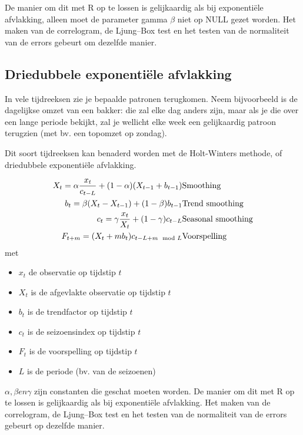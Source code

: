 De manier om dit met R op te lossen is gelijkaardig als bij exponentiële afvlakking, alleen moet de parameter gamma $\beta$ niet op NULL gezet worden. Het maken van de correlogram, de Ljung–Box test en het testen van de normaliteit van de errors gebeurt om dezelfde manier. 

\subsection{Driedubbele exponentiële afvlakking}

In vele tijdreeksen zie je bepaalde patronen terugkomen. Neem bijvoorbeeld is de dagelijkse omzet van een bakker: die zal elke dag anders zijn, maar als je die over een lange periode bekijkt, zal je wellicht elke week een gelijkaardig patroon terugzien (met bv. een topomzet op zondag).

Dit soort tijdreeksen kan benaderd worden met de Holt-Winters methode, of driedubbele exponentiële afvlakking.

\begin{eqnarray}
  X_{t} = \alpha \frac{x_{t}}{c_{t-L}} + (1-\alpha) (X_{t-1} + b_{t-1}) & \textnormal{Smoothing}\\
  b_{t} = \beta (X_{t} - X_{t-1}) + (1-\beta)b_{t-1} & \textnormal{Trend smoothing} \\
  c_{t} = \gamma \frac{x_{t}}{X_{t}} + (1-\gamma)c_{t-L} & \textnormal{Seasonal smoothing} \\
  F_{t+m} = (X_{t} + mb_{t})c_{t-L+m \mod L}  & \textnormal{Voorspelling}
  \label{eq:HoltWinters}
\end{eqnarray}
 met 
\begin{itemize}
	\item $x_{t}$ de observatie op tijdstip $t$
	\item $X_{t}$ is de afgevlakte observatie op tijdstip $t$
	\item $b_{t}$ is de trendfactor op tijdstip $t$
	\item $c_{t}$ is de seizoensindex op tijdstip $t$
	\item $F_{t}$ is de voorspelling op tijdstip $t$
	\item $L$ is de periode (bv. van de seizoenen)
\end{itemize}

$\alpha, \beta en \gamma$ zijn constanten die geschat moeten worden. 
De manier om dit met R op te lossen is gelijkaardig als bij exponentiële afvlakking. Het maken van de correlogram, de Ljung–Box test en het testen van de normaliteit van de errors gebeurt op dezelfde manier. 

